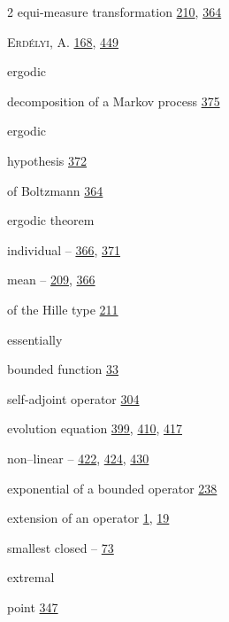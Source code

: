\begin{multicols}{2}
\noindent equi-measure transformation \hyperlink{page.210}{210}, \hyperlink{page.364}{364}\par
\noindent \textsc{Erdélyi}, A. \hyperlink{page.168}{168}, \hyperlink{page.449}{449}\par
\noindent ergodic\par
\hspace*{1.1em}decomposition of a Markov process \hyperlink{page.375}{375}\par
\noindent ergodic\par
\hspace*{1.1em}hypothesis \hyperlink{page.372}{372}\par
\hspace*{2.2em}of Boltzmann \hyperlink{page.364}{364}\par
\noindent ergodic theorem\par
\hspace*{1.1em}individual -- \hyperlink{page.366}{366}, \hyperlink{page.371}{371}\par
\hspace*{1.1em}mean -- \hyperlink{page.209}{209}, \hyperlink{page.366}{366}\par
\hspace*{1.1em}of the Hille type \hyperlink{page.211}{211}\par
\noindent essentially\par
\hspace*{1.1em}bounded function \hyperlink{page.33}{33}\par
\hspace*{1.1em}self-adjoint operator \hyperlink{page.304}{304}\par
\noindent evolution equation \hyperlink{page.399}{399}, \hyperlink{page.410}{410}, \hyperlink{page.417}{417}\par
\hspace*{1.1em}non--linear -- \hyperlink{page.422}{422}, \hyperlink{page.424}{424}, \hyperlink{page.430}{430}\par
\noindent exponential of a bounded operator \hyperlink{page.238}{238}\par
\noindent extension of an operator \hyperlink{page.1}{1}, \hyperlink{page.19}{19}\par
\hspace*{1.1em}smallest closed -- \hyperlink{page.73}{73}\par
\noindent extremal\par
\hspace*{1.1em}point \hyperlink{page.347}{347}\par

\end{multicols}
